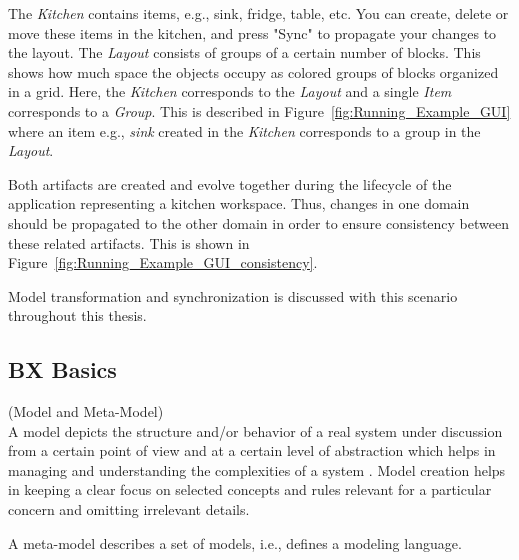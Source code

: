 The \textit{Kitchen} contains items, e.g., sink, fridge, table, etc. You can create, delete or move these items in the kitchen, and press "Sync" to propagate your changes to the layout. The \textit{Layout} consists of groups of a certain number of blocks. This shows how much space the objects occupy as colored groups of blocks organized in a grid. Here, the \textit{Kitchen} corresponds to the \textit{Layout} and a single \textit{Item} corresponds to a \textit{Group}. This is described in Figure~\ref{fig:Running_Example_GUI} where an item e.g., \textit{sink} created in the \textit{Kitchen} corresponds to a group in the \textit{Layout}.

Both artifacts are created and evolve together during the lifecycle of the application representing a kitchen workspace. Thus, changes in one domain should be propagated to the other domain in order to ensure consistency between these related artifacts. This is shown in Figure~\ref{fig:Running_Example_GUI_consistency}.

Model transformation and synchronization is discussed with this scenario throughout this thesis. 

\subsection{BX Basics}\label{subsec:definitions}

\begin{defn}\label{defModel} (Model and Meta-Model)\\
A model depicts the structure and/or behavior of a real system under discussion from a certain point of view and at a certain level of abstraction which helps in managing and understanding the complexities of a system \cite{uml} \cite{mdsd}. Model creation helps in keeping a clear focus on selected concepts and rules relevant for a particular concern and omitting irrelevant details.

A meta-model describes a set of models, i.e., defines a modeling language. 
\end{defn} 

